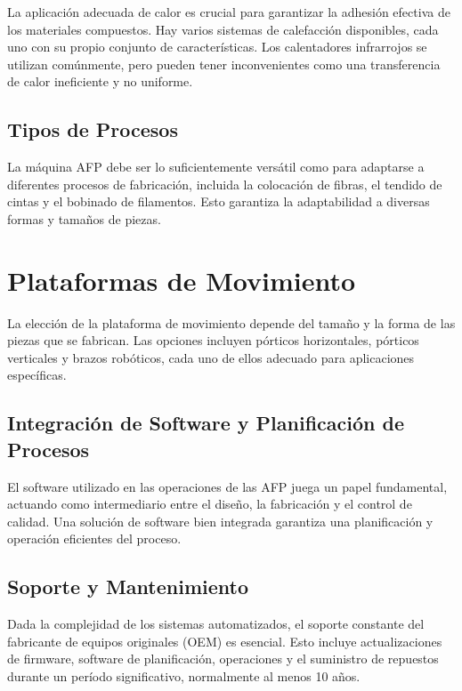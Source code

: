 \begin{enumerate}[label=\arabic*.]
La aplicación adecuada de calor es crucial para garantizar la adhesión efectiva de los materiales compuestos. Hay varios sistemas de calefacción disponibles, cada uno con su propio conjunto de características. Los calentadores infrarrojos se utilizan comúnmente, pero pueden tener inconvenientes como una transferencia de calor ineficiente y no uniforme.

\subsection{Tipos de Procesos}

La máquina AFP debe ser lo suficientemente versátil como para adaptarse a diferentes procesos de fabricación, incluida la colocación de fibras, el tendido de cintas y el bobinado de filamentos. Esto garantiza la adaptabilidad a diversas formas y tamaños de piezas.

\section{Plataformas de Movimiento}

La elección de la plataforma de movimiento depende del tamaño y la forma de las piezas que se fabrican. Las opciones incluyen pórticos horizontales, pórticos verticales y brazos robóticos, cada uno de ellos adecuado para aplicaciones específicas.

\subsection{Integración de Software y Planificación de Procesos}

El software utilizado en las operaciones de las AFP juega un papel fundamental, actuando como intermediario entre el diseño, la fabricación y el control de calidad. Una solución de software bien integrada garantiza una planificación y operación eficientes del proceso.

\subsection{Soporte y Mantenimiento}

Dada la complejidad de los sistemas automatizados, el soporte constante del fabricante de equipos originales (OEM) es esencial. Esto incluye actualizaciones de firmware, software de planificación, operaciones y el suministro de repuestos durante un período significativo, normalmente al menos 10 años.


\end{enumerate}
